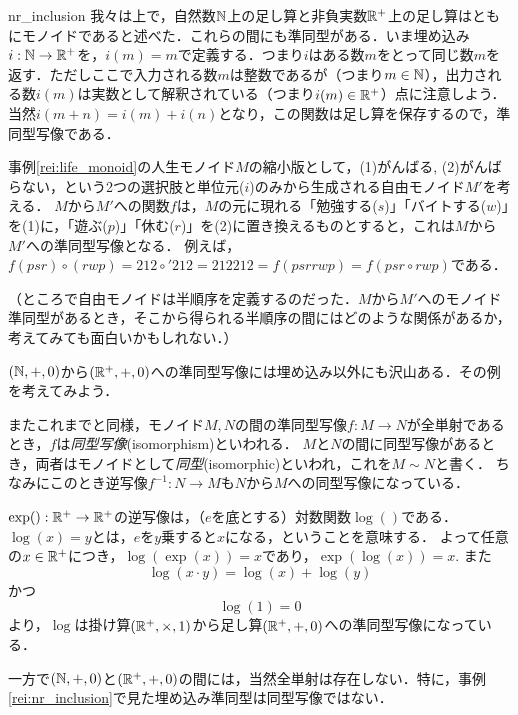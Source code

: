 \documentclass[11pt,a4paper, dvipdfmx]{jsarticle}
\begin{document}
\begin{rei}{}{nr_inclusion}
    我々は上で，自然数$\mathbb{N}$上の足し算と非負実数$\mathbb{R}^+$上の足し算はともにモノイドであると述べた．これらの間にも準同型がある．いま埋め込み$i:\mathbb{N} \to \mathbb{R}^+$を，$i(m)=m$で定義する．つまり$i$はある数$m$をとって同じ数$m$を返す．ただしここで入力される数$m$は整数であるが（つまり$m \in \mathbb{N}$），出力される数$i(m)$は実数として解釈されている（つまり$i(m) \in \mathbb{R}^+$）点に注意しよう．
    当然$i(m+n) = i(m)+i(n)$となり，この関数は足し算を保存するので，準同型写像である．
\end{rei} 

\begin{rei}{}{}
    事例\ref{rei:life_monoid}の人生モノイド$M$の縮小版として，(1)がんばる, (2)がんばらない，という2つの選択肢と単位元($i$)のみから生成される自由モノイド$M'$を考える．
    $M$から$M'$への関数$f$は，$M$の元に現れる「勉強する($s$)」「バイトする($w$)」を(1)に，「遊ぶ($p$)」「休む($r$)」を(2)に置き換えるものとすると，これは$M$から$M'$への準同型写像となる．
    例えば，$f(psr) \circ (rwp) = 212 \circ' 212 = 212212 = f(psrrwp) = f(psr \circ rwp)$である．

    （ところで自由モノイドは半順序を定義するのだった．$M$から$M'$へのモノイド準同型があるとき，そこから得られる半順序の間にはどのような関係があるか，考えてみても面白いかもしれない．）
\end{rei}


\begin{renshu}{}{}
    $(\mathbb{N}, +, 0)$から$(\mathbb{R}^+, +, 0)$への準同型写像には埋め込み以外にも沢山ある．その例を考えてみよう．
\end{renshu}


またこれまでと同様，モノイド$M, N$の間の準同型写像$f:M \to N$が全単射であるとき，$f$は\emph{同型写像}(isomorphism)といわれる．
$M$と$N$の間に同型写像があるとき，両者はモノイドとして\emph{同型}(isomorphic)といわれ，これを$M \sim N$と書く．
ちなみにこのとき逆写像$f^{-1}:N \to M$も$N$から$M$への同型写像になっている．


\begin{rei}{}{}
    $\exp():\mathbb{R}^+ \to \mathbb{R}^+$の逆写像は，（$e$を底とする）対数関数$\log()$である．
    $\log(x)=y$とは，$e$を$y$乗すると$x$になる，ということを意味する．
    よって任意の$x\in\mathbb{R}^+$につき，$\log(\exp(x))=x$であり，$\exp(\log(x))=x$. また
    \[ \log(x \cdot y) = \log(x) + \log(y) \]
    かつ
    \[ \log(1) = 0 \]
    より，$\log$は掛け算$(\mathbb{R}^+, \times, 1)$から足し算$(\mathbb{R}^+, +, 0)$への準同型写像になっている．

    一方で$(\mathbb{N}, +, 0)$と$(\mathbb{R}^+, +, 0)$の間には，当然全単射は存在しない．特に，事例\ref{rei:nr_inclusion}で見た埋め込み準同型は同型写像ではない．
\end{rei}
\end{document}

